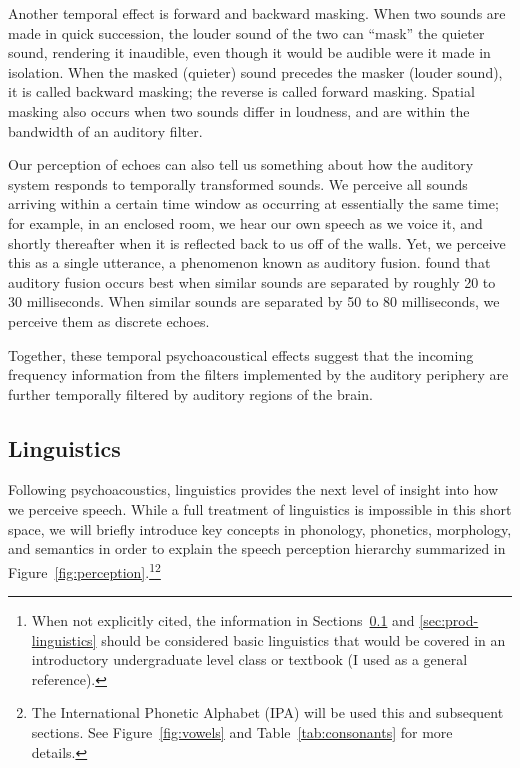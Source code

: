 Another temporal effect is forward and backward masking.
When two sounds are made in quick succession,
the louder sound of the two can
``mask'' the quieter sound,
rendering it inaudible,
even though it would be audible
were it made in isolation.
When the masked (quieter) sound
precedes the masker (louder sound),
it is called backward masking;
the reverse is called forward masking.
Spatial masking also occurs
when two sounds differ in loudness,
and are within the bandwidth
of an auditory filter.

Our perception of echoes can also tell us
something about how the auditory system
responds to temporally transformed sounds.
We perceive all sounds arriving within
a certain time window as occurring at essentially
the same time;
for example, in an enclosed room,
we hear our own speech as we voice it,
and shortly thereafter when it is reflected
back to us off of the walls.
Yet, we perceive this as a single utterance,
a phenomenon known as auditory fusion.
\citet{haas1972} found that auditory fusion occurs
best when similar sounds are separated by roughly
20 to 30 milliseconds.
When similar sounds are separated by 50 to 80 milliseconds,
we perceive them as discrete echoes.

Together, these temporal psychoacoustical effects
suggest that the incoming frequency information
from the filters implemented by the auditory periphery
are further temporally filtered
by auditory regions of the brain.

\subsection{Linguistics}
\label{sec:perc-linguistics}

Following psychoacoustics,
linguistics provides
the next level of insight into
how we perceive speech.
While a full treatment of linguistics
is impossible in this short space,
we will briefly introduce
key concepts in phonology,
phonetics, morphology, and semantics
in order to
explain the speech perception hierarchy
summarized in Figure~\ref{fig:perception}.\footnote{
  When not explicitly cited,
  the information in Sections~\ref{sec:perc-linguistics}
  and \ref{sec:prod-linguistics}
  should be considered
  basic linguistics
  that would be covered in an
  introductory undergraduate level
  class or textbook
  (I used \citet{roach2010} as a general reference).
}\footnote{The International Phonetic Alphabet (IPA)
  will be used this and subsequent sections.
  See Figure~\ref{fig:vowels} and Table~\ref{tab:consonants}
  for more details.}

